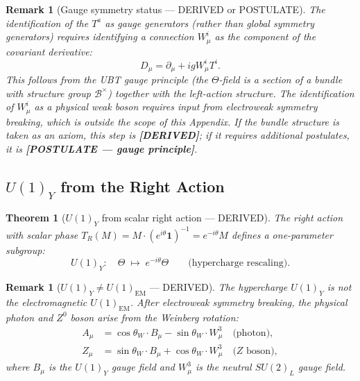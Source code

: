\documentclass[12pt]{article}
\newtheorem{theorem}[definition]{Theorem}
\newtheorem{remark}[definition]{Remark}
\begin{document}
\begin{remark}[Gauge symmetry status --- DERIVED or POSTULATE]
\label{rem:su2l_gauge}
The identification of the $T^a$ as \emph{gauge} generators (rather than global symmetry
generators) requires identifying a connection $W^i_\mu$ as the component of the covariant
derivative:
\begin{equation}
  D_\mu = \partial_\mu + ig W^i_\mu T^i. \tag{DERIVED, given UBT fiber bundle structure}
\end{equation}
This follows from the UBT gauge principle (the $\Theta$-field is a section of a bundle
with structure group $\mathcal{B}^\times$) together with the left-action structure.
The identification of $W^i_\mu$ as a physical weak boson requires input from
electroweak symmetry breaking, which is outside the scope of this Appendix.
If the bundle structure is taken as an axiom, this step is \textbf{[DERIVED]};
if it requires additional postulates, it is \textbf{[POSTULATE --- gauge principle]}.
\end{remark}

\subsection{$U(1)_Y$ from the Right Action}
\label{subsec:u1y_right_action}

\begin{theorem}[$U(1)_Y$ from scalar right action --- DERIVED]
\label{thm:u1y}
The right action with scalar phase $T_R(M) = M \cdot (e^{i\theta}\mathbf{1})^{-1}
= e^{-i\theta} M$ defines a one-parameter subgroup:
\begin{equation}
  U(1)_Y : \quad \Theta \;\mapsto\; e^{-i\theta} \Theta
  \qquad \text{(hypercharge rescaling)}. \tag{DERIVED}
\end{equation}
\end{theorem}

\begin{remark}[$U(1)_Y \neq U(1)_\mathrm{EM}$ --- DERIVED]
\label{rem:u1y_not_em}
The hypercharge $U(1)_Y$ is \emph{not} the electromagnetic $U(1)_\mathrm{EM}$.
After electroweak symmetry breaking, the physical photon and $Z^0$ boson arise
from the Weinberg rotation:
\begin{align}
  A_\mu &= \cos\theta_W \cdot B_\mu - \sin\theta_W \cdot W^3_\mu
    \quad \text{(photon)}, \\
  Z_\mu &= \sin\theta_W \cdot B_\mu + \cos\theta_W \cdot W^3_\mu
    \quad \text{($Z$ boson)},
\end{align}
where $B_\mu$ is the $U(1)_Y$ gauge field and $W^3_\mu$ is the neutral
$SU(2)_L$ gauge field.
\end{remark}
\end{document}
